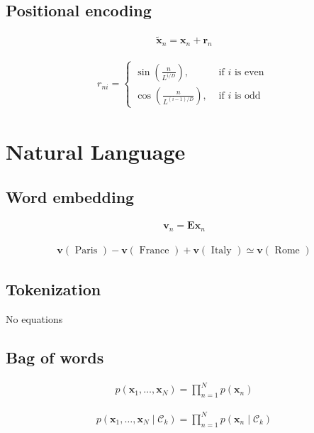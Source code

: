 \documentclass{article}
\begin{document}
\subsection{Positional encoding}

\begin{align*}
\widetilde{\mathbf{x}}_{n}=\mathbf{x}_{n}+\mathbf{r}_{n} \tag{12.24}
\end{align*}

\begin{align*}
r_{n i}= \begin{cases}\sin \left(\frac{n}{L^{i / D}}\right), & \text{ if } i \text{ is even }  \tag{12.25}\\ \cos \left(\frac{n}{L^{(i-1) / D}}\right), & \text{ if } i \text{ is odd }\end{cases}
\end{align*}

\section{Natural Language}

\subsection{Word embedding}
\begin{align*}
\mathbf{v}_{n}=\mathbf{E} \mathbf{x}_{n} \tag{12.26}
\end{align*}

\begin{align*}
\mathbf{v}(\text{ Paris })-\mathbf{v}(\text{ France })+\mathbf{v}(\text{ Italy }) \simeq \mathbf{v}(\text{ Rome }) \tag{12.27}
\end{align*}

\subsection{Tokenization}
No equations

\subsection{Bag of words}
\begin{align*}
p\left(\mathbf{x}_{1}, \ldots, \mathbf{x}_{N}\right)=\prod_{n=1}^{N} p\left(\mathbf{x}_{n}\right) \tag{12.28}
\end{align*}

\begin{align*}
p\left(\mathbf{x}_{1}, \ldots, \mathbf{x}_{N} \mid \mathcal{C}_{k}\right)=\prod_{n=1}^{N} p\left(\mathbf{x}_{n} \mid \mathcal{C}_{k}\right) \tag{12.29}
\end{align*}
\end{document}
